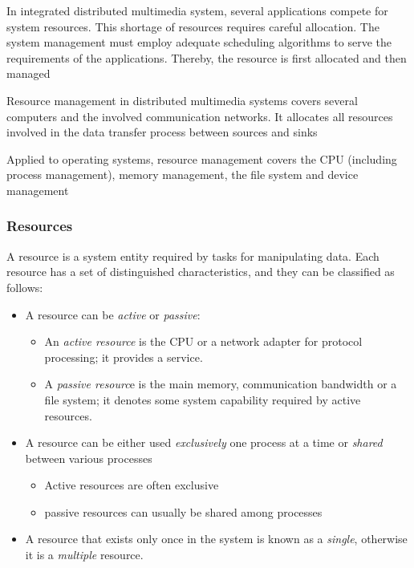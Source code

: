 	In integrated distributed multimedia system, several applications compete for system resources. This shortage of resources requires careful allocation. The system management must employ adequate scheduling algorithms to serve the requirements of the applications. Thereby, the resource is first allocated and then
	managed
	
	Resource management in distributed multimedia systems covers several computers and the involved communication networks. It allocates all resources involved in the data transfer process between sources and sinks
	
	Applied to operating systems, resource management covers the CPU (including process management), memory management, the file system and device management

\subsubsection{Resources}
A resource is a system entity required by tasks for manipulating data. Each resource has a set of distinguished characteristics, and they can be classified as follows:

\begin{itemize}
	\item A resource can be \textit{active} or \textit{passive}:
		\begin{itemize}
			\item An \textit{active resource} is the CPU or a network adapter for protocol processing; it provides a service.
			
			\item A \textit{passive resourc}e is the main memory, communication bandwidth or a file system; it denotes some system capability required by active resources.
		\end{itemize}
	 
	\item A resource can be either used \textit{exclusively} one process at a time or
	\textit{shared} between various processes
		\begin{itemize}
			\item Active resources are often exclusive
			\item passive resources can usually be shared among processes
		\end{itemize}
	
	 \item A resource that exists only once in the system is known as a \textit{single},
	 otherwise it is a \textit{multiple} resource.
\end{itemize}

